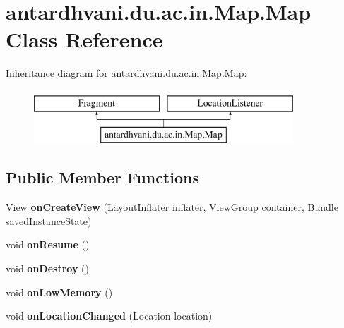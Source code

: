 \hypertarget{classantardhvani_1_1du_1_1ac_1_1in_1_1_map_1_1_map}{}\section{antardhvani.\+du.\+ac.\+in.\+Map.\+Map Class Reference}
\label{classantardhvani_1_1du_1_1ac_1_1in_1_1_map_1_1_map}
Inheritance diagram for antardhvani.\+du.\+ac.\+in.\+Map.\+Map\+:\begin{figure}[H]
\begin{center}
\leavevmode
\includegraphics[height=2.000000cm]{classantardhvani_1_1du_1_1ac_1_1in_1_1_map_1_1_map}
\end{center}
\end{figure}
\subsection*{Public Member Functions}
\begin{DoxyCompactItemize}
\item 
\hypertarget{classantardhvani_1_1du_1_1ac_1_1in_1_1_map_1_1_map_a07f4ed8eabb305d04d49104d18efc9c1}{}View {\bfseries on\+Create\+View} (Layout\+Inflater inflater, View\+Group container, Bundle saved\+Instance\+State)\label{classantardhvani_1_1du_1_1ac_1_1in_1_1_map_1_1_map_a07f4ed8eabb305d04d49104d18efc9c1}

\item 
\hypertarget{classantardhvani_1_1du_1_1ac_1_1in_1_1_map_1_1_map_aeaec445deabfba77cdaf79cb7c21092d}{}void {\bfseries on\+Resume} ()\label{classantardhvani_1_1du_1_1ac_1_1in_1_1_map_1_1_map_aeaec445deabfba77cdaf79cb7c21092d}

\item 
\hypertarget{classantardhvani_1_1du_1_1ac_1_1in_1_1_map_1_1_map_a06f5976d3e6e78b48ad4144573add047}{}void {\bfseries on\+Destroy} ()\label{classantardhvani_1_1du_1_1ac_1_1in_1_1_map_1_1_map_a06f5976d3e6e78b48ad4144573add047}

\item 
\hypertarget{classantardhvani_1_1du_1_1ac_1_1in_1_1_map_1_1_map_a19a980b4de355ee0bb386707f79b9b23}{}void {\bfseries on\+Low\+Memory} ()\label{classantardhvani_1_1du_1_1ac_1_1in_1_1_map_1_1_map_a19a980b4de355ee0bb386707f79b9b23}

\item 
\hypertarget{classantardhvani_1_1du_1_1ac_1_1in_1_1_map_1_1_map_aeaf349e81080c5386ddc3114619365a5}{}void {\bfseries on\+Location\+Changed} (Location location)\label{classantardhvani_1_1du_1_1ac_1_1in_1_1_map_1_1_map_aeaf349e81080c5386ddc3114619365a5}

\end{DoxyCompactItemize}
